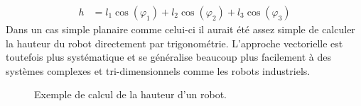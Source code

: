 \begin{align}
h &= l_1 \cos (\varphi_1) + l_2 \cos (\varphi_2) + l_3 \cos (\varphi_3)
\label{eq:vecaddprojphi}
\end{align} 
Dans un cas simple planaire comme celui-ci il aurait été assez simple de calculer la hauteur du robot directement par trigonométrie. L'approche vectorielle est toutefois plus systématique et se généralise beaucoup plus facilement à des systèmes complexes et tri-dimensionnels comme les robots industriels.
%
\begin{figure}[H]
        \centering
				\hspace{3pt}
				\hspace{3pt}
				\hspace{3pt}
        \caption{Exemple de calcul de la hauteur d'un robot.}
				\label{fig:vecposunipro}
\end{figure}



